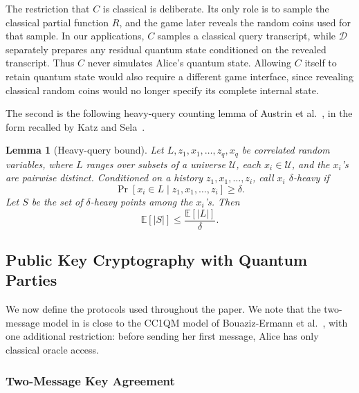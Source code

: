 \documentclass[11pt]{article}
\newtheorem{lemma}[lemma]{Lemma}
\newcommand{\cD}{\mathcal{D}}
\newcommand{\cU}{\mathcal{U}}
\begin{document}
The restriction that \(C\) is classical is deliberate.  Its only role is to
sample the classical partial function \(R\), and the game later reveals the
random coins used for that sample.  In our applications, \(C\) samples a
classical query transcript, while \(\cD\) separately prepares any residual
quantum state conditioned on the revealed transcript.  Thus \(C\) never
simulates Alice's quantum state.  Allowing \(C\) itself to retain quantum
state would also require a different game interface, since revealing
classical random coins would no longer specify its complete internal state.

The second is the following heavy-query counting lemma of Austrin et
al.~\cite[Lemma~3.4]{AustrinEtAl22}, in the form recalled by Katz and
Sela~\cite[Lemma~4]{KatzSela24}.

\begin{lemma}[Heavy-query bound]\label{lem:heavy-bound}
Let \(L,z_1,x_1,\ldots,z_q,x_q\) be correlated random variables, where
\(L\) ranges over subsets of a universe \(\cU\), each \(x_i\in\cU\), and
the \(x_i\)'s are pairwise distinct.  Conditioned on a history
\(z_1,x_1,\ldots,z_i\), call \(x_i\) \(\delta\)-heavy if
\[
  \Pr[x_i\in L\mid z_1,x_1,\ldots,z_i]\ge\delta.
\]
Let \(S\) be the set of \(\delta\)-heavy points among the \(x_i\)'s.  Then
\[
  \mathbb{E}[|S|]\le\frac{\mathbb{E}[|L|]}{\delta}.
\]
\end{lemma}

\subsection{Public Key Cryptography with Quantum Parties}\label{sec:model}

We now define the protocols used throughout
the paper. We note that the two-message model in  is close to the CC1QM
model of Bouaziz-Ermann et al.~\cite{BouazizEtAl24}, with one additional
restriction: before sending her first message, Alice has only classical
oracle access.

\subsubsection{Two-Message Key Agreement}
\end{document}
